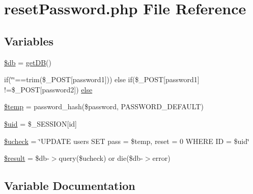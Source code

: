 \hypertarget{resetPassword_8php}{}\section{reset\+Password.\+php File Reference}
\label{resetPassword_8php}
\subsection*{Variables}
\begin{DoxyCompactItemize}
\item 
\mbox{\hyperlink{resetPassword_8php_a1fa3127fc82f96b1436d871ef02be319}{\$db}} = \mbox{\hyperlink{database_8php_a4162847310de81b83504109485866a7c}{get\+DB}}()
\item 
if(\char`\"{}\char`\"{}==trim(\$\+\_\+\+P\+O\+ST\mbox{[}\textquotesingle{}password1\textquotesingle{}\mbox{]})) else if(\$\+\_\+\+P\+O\+ST\mbox{[}\textquotesingle{}password1\textquotesingle{}\mbox{]} !=\$\+\_\+\+P\+O\+ST\mbox{[}\textquotesingle{}password2\textquotesingle{}\mbox{]}) \mbox{\hyperlink{resetPassword_8php_a14bb204bf8fd64deb24024a16b10fb80}{else}}
\item 
\mbox{\hyperlink{resetPassword_8php_a0d57fb0317e19ec798aa625381ebf342}{\$temp}} = password\+\_\+hash(\$password, P\+A\+S\+S\+W\+O\+R\+D\+\_\+\+D\+E\+F\+A\+U\+LT)
\item 
\mbox{\hyperlink{resetPassword_8php_a109bbd7f4add27541707b191b73ef84a}{\$uid}} = \$\+\_\+\+S\+E\+S\+S\+I\+ON\mbox{[}\textquotesingle{}id\textquotesingle{}\mbox{]}
\item 
\mbox{\hyperlink{resetPassword_8php_ab8fb2b266e6115a51d358bee61a9173a}{\$ucheck}} = \char`\"{}U\+P\+D\+A\+TE users S\+ET pass = \textquotesingle{}\$temp\textquotesingle{}, reset = 0 W\+H\+E\+RE ID = \textquotesingle{}\$uid\textquotesingle{}\char`\"{}
\item 
\mbox{\hyperlink{resetPassword_8php_a112ef069ddc0454086e3d1e6d8d55d07}{\$result}} = \$db-\/$>$query(\$ucheck) or die(\$db-\/$>$error)
\end{DoxyCompactItemize}


\subsection{Variable Documentation}
\mbox{\label{resetPassword_8php_a1fa3127fc82f96b1436d871ef02be319}} 
